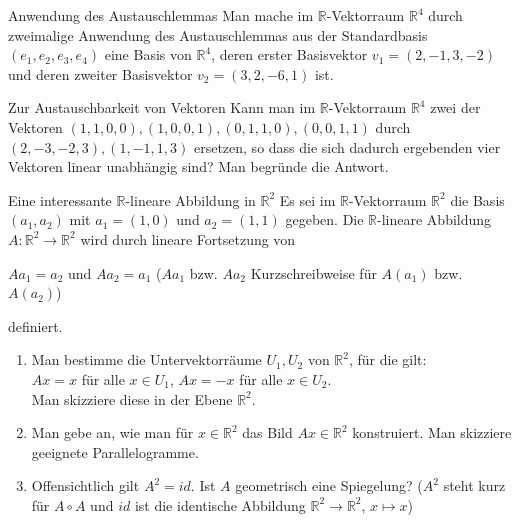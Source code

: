 \documentclass{uebblatt}
\begin{document}

\begin{aufgabe}{Anwendung des Austauschlemmas}
Man mache im $\mathbb{R}$-Vektorraum $\mathbb{R}^4$ durch zweimalige Anwendung des Austauschlemmas aus der Standardbasis $(e_1, e_2, e_3, e_4)$ eine Basis von $\mathbb{R}^4$, deren erster Basisvektor $v_1 = (2, -1, 3, -2)$ und deren zweiter Basisvektor $v_2 = (3, 2, -6, 1)$ ist.
\end{aufgabe}


\begin{aufgabe}{Zur Austauschbarkeit von Vektoren}
Kann man im $\mathbb{R}$-Vektorraum $\mathbb{R}^4$ zwei der Vektoren $(1, 1, 0, 0), (1, 0, 0, 1), (0, 1, 1, 0), (0, 0, 1, 1)$ durch $(2, -3, -2, 3), (1, -1, 1, 3)$ ersetzen, so dass die sich dadurch ergebenden vier Vektoren linear unabhängig sind? Man begründe die Antwort.
\end{aufgabe}


\begin{aufgabe}{Eine interessante $\mathbb{R}$-lineare Abbildung in $\mathbb{R}^2$}
Es sei im $\mathbb{R}$-Vektorraum $\mathbb{R}^2$ die Basis $(a_1, a_2)$ mit $a_1 = (1, 0)$ und $a_2 = (1, 1)$ gegeben. Die $\mathbb{R}$-lineare Abbildung $A: \mathbb{R}^2 \to \mathbb{R}^2$ wird durch lineare Fortsetzung von
\begin{center}
$Aa_1 = a_2$ und $Aa_2 = a_1$ ($Aa_1$ bzw. $Aa_2$ Kurzschreibweise für $A(a_1)$ bzw. $A(a_2)$)
\end{center}
definiert.
\begin{enumerate}
\item Man bestimme die Untervektorräume $U_1 , U_2$ von $\mathbb{R}^2$, für die gilt:\\
$Ax = x$ für alle $x \in U_1$, $Ax = -x$ für alle $x \in U_2$.\\
Man skizziere diese in der Ebene $\mathbb{R}^2$.
\item Man gebe an, wie man für $x \in \mathbb{R}^2$ das Bild $Ax \in \mathbb{R}^2$ konstruiert. Man skizziere geeignete Parallelogramme.
\item Offensichtlich gilt $A^2 = id$. Ist $A$ geometrisch eine Spiegelung? ($A^2$ steht kurz für $A \circ A$ und $id$ ist die identische Abbildung $\mathbb{R}^2 \to \mathbb{R}^2$, $x \mapsto x$)
\end{enumerate}
\end{aufgabe}
\end{document}

